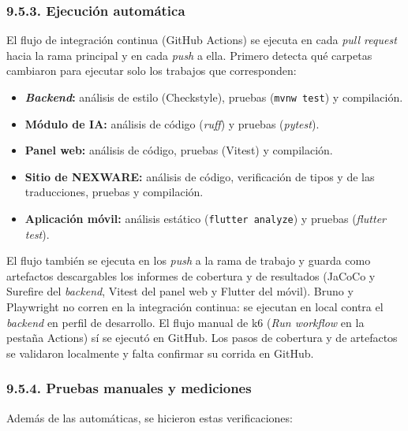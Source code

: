 \subsubsection{9.5.3. Ejecución automática}

El flujo de integración continua (GitHub Actions) se ejecuta en cada \textit{pull request} hacia la rama principal y en cada \textit{push} a ella. Primero detecta qué carpetas cambiaron para ejecutar solo los trabajos que corresponden:

\begin{itemize}
    \item \textbf{\textit{Backend}:} análisis de estilo (Checkstyle), pruebas (\texttt{mvnw test}) y compilación.
    \item \textbf{Módulo de IA:} análisis de código (\textit{ruff}) y pruebas (\textit{pytest}).
    \item \textbf{Panel web:} análisis de código, pruebas (Vitest) y compilación.
    \item \textbf{Sitio de NEXWARE:} análisis de código, verificación de tipos y de las traducciones, pruebas y compilación.
    \item \textbf{Aplicación móvil:} análisis estático (\texttt{flutter analyze}) y pruebas (\textit{flutter test}).
\end{itemize}

El flujo también se ejecuta en los \textit{push} a la rama de trabajo y guarda como artefactos descargables los informes de cobertura y de resultados (JaCoCo y Surefire del \textit{backend}, Vitest del panel web y Flutter del móvil). Bruno y Playwright no corren en la integración continua: se ejecutan en local contra el \textit{backend} en perfil de desarrollo. El flujo manual de k6 (\textit{Run workflow} en la pestaña Actions) sí se ejecutó en GitHub. Los pasos de cobertura y de artefactos se validaron localmente y falta confirmar su corrida en GitHub.

\subsubsection{9.5.4. Pruebas manuales y mediciones}

Además de las automáticas, se hicieron estas verificaciones:


